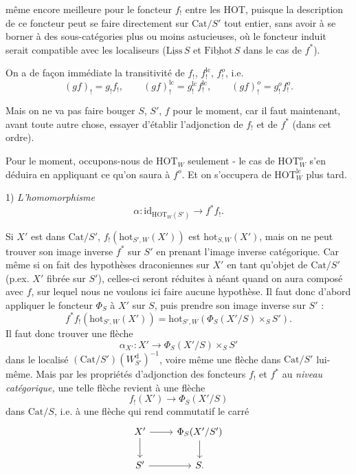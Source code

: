 \documentclass[11pt]{article}
\newcommand{\printedpage}[1]{\marginpar{\footnotesize p.~#1}}
\newcommand{\msp}[1]{\marginpar{\footnotesize [#1]}}
\newcommand{\HOT}{\mathrm{HOT}}
\newcommand{\Cat}{\mathrm{Cat}}
\newcommand{\id}{\mathrm{id}}
\newcommand{\hot}{\mathrm{hot}}
\newcommand{\Wd}{W^{\mathrm{d}}}
\begin{document}
\printedpage{84}
même encore meilleure pour le foncteur $f_!$ entre les HOT, puisque la description de ce foncteur peut se faire directement sur $\Cat/S'$ tout entier, sans avoir à se borner à des sous-catégories plus ou moins \msp{page 138}astucieuses, où le foncteur induit serait compatible avec les localiseurs ($\underline{\mathrm{Liss}}\,S$ et $\underline{\mathrm{Fibhot}}\,S$ dans le cas de $f^*$).

On a de façon immédiate la transitivité de $f_!$, $f_!^{\mathrm{lc}}$, $f_!^{o}$, i.e.
\[
(gf)_! = g_!f_!, \qquad (gf)_!^{\mathrm{lc}} = g_!^{\mathrm{lc}}f_!^{\mathrm{lc}}, \qquad (gf)_!^{o} = g_!^{o}f_!^{o}.
\]

Mais on ne va pas faire bouger $S$, $S'$, $f$ pour le moment, car il faut maintenant, avant toute autre chose, essayer d'établir l'adjonction de $f_!$ et de $f^*$ (dans cet ordre).

Pour le moment, occupons-nous de $\HOT_W$ seulement - le cas de $\HOT_W^{o}$ s'en déduira en appliquant ce qu'on saura à $f^{o}$. Et on s'occupera de $\HOT_W^{\mathrm{lc}}$ plus tard.

1) \textit{L'homomorphisme}
\[
\alpha : \id_{\HOT_W(S')} \longrightarrow f^*f_!.
\]

Si $X'$ est dans $\Cat/S'$, $f_!(\hot_{S',W}(X'))$ est $\hot_{S,W}(X')$, mais on ne peut trouver son image inverse $f^*$ sur $S'$ en prenant l'image inverse catégorique. Car même si on fait des hypothèses draconiennes sur $X'$ en tant qu'objet de $\Cat/S'$ (p.ex. $X'$ fibrée sur $S'$), celles-ci seront réduites à néant quand on aura composé avec $f$, sur lequel nous ne voulons ici faire aucune hypothèse. Il \msp{page 139}faut donc d'abord appliquer le foncteur $\Phi_S$ à $X'$ sur $S$, puis prendre son image inverse sur $S'$ :
\[
f^*f_!(\hot_{S',W}(X')) = \hot_{S',W}(\Phi_S(X'/S)\times_S S').
\]
Il faut donc trouver une flèche
\[
\alpha_{X'} : X' \longrightarrow \Phi_S(X'/S)\times_S S'
\]
dans le localisé $(\Cat/S')(\Wd_{S'})^{-1}$, voire même une flèche dans $\Cat/S'$ lui-même. Mais par les propriétés d'adjonction des foncteurs $f_!$ et $f^*$ au \textit{niveau catégorique,} une telle flèche revient à une flèche
\[
f_!(X') \longrightarrow \Phi_S(X'/S)
\]
dans $\Cat/S$, i.e. à une flèche qui rend commutatif le carré
\[
\begin{tikzcd}
X' \arrow[r] \arrow[d] & \Phi_S(X'/S') \arrow[d] \\ %
S' \arrow[r] & S.
\end{tikzcd}
\]
\end{document}
